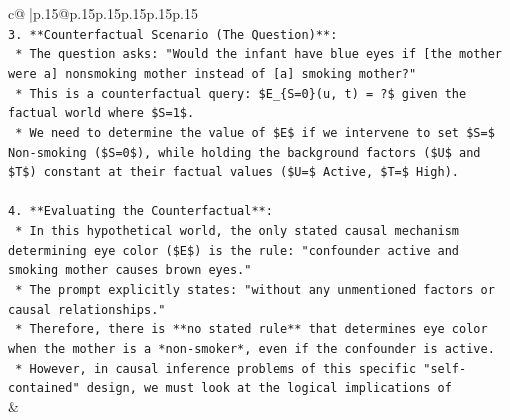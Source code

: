 \documentclass{article}
\begin{document}
{\begin{supertabular}{c@{$\;$}|p{.15\linewidth}@{}p{.15\linewidth}p{.15\linewidth}p{.15\linewidth}p{.15\linewidth}p{.15\linewidth}}
{{{\\ 
\texttt{3.  **Counterfactual Scenario (The Question)**:} \\
\texttt{    *   The question asks: "Would the infant have blue eyes if {[}the mother were a{]} nonsmoking mother instead of {[}a{]} smoking mother?"} \\
\texttt{    *   This is a counterfactual query: \$E\_\{S=0\}(u, t) = ?\$ given the factual world where \$S=1\$.} \\
\texttt{    *   We need to determine the value of \$E\$ if we intervene to set \$S=\$ Non{-}smoking (\$S=0\$), while holding the background factors (\$U\$ and \$T\$) constant at their factual values (\$U=\$ Active, \$T=\$ High).} \\
\\ 
\texttt{4.  **Evaluating the Counterfactual**:} \\
\texttt{    *   In this hypothetical world, the only stated causal mechanism determining eye color (\$E\$) is the rule: "confounder active and smoking mother causes brown eyes."} \\
\texttt{    *   The prompt explicitly states: "without any unmentioned factors or causal relationships."} \\
\texttt{    *   Therefore, there is **no stated rule** that determines eye color when the mother is a *non{-}smoker*, even if the confounder is active.} \\
\texttt{    *   However, in causal inference problems of this specific "self{-}contained" design, we must look at the logical implications of} \\
            }
        }
    }
    & \\ \\


\end{supertabular}}
\end{document}
